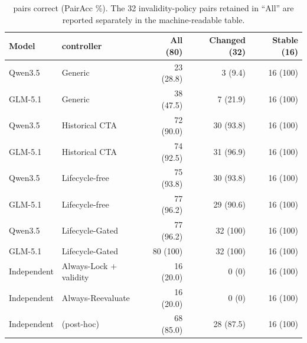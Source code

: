 \documentclass[10pt]{article}
\begin{document}
\begin{table}[h]
\centering
\scriptsize
\setlength{\tabcolsep}{3pt}
\begin{tabular}{llrrr}
\toprule
Model & \PrimaryDiagnostic{} controller & All (80) & Changed (32) & Stable (16) \\
\midrule
Qwen3.5 & Generic & 23 (28.8) & 3 (9.4) & 16 (100) \\
GLM-5.1 & Generic & 38 (47.5) & 7 (21.9) & 16 (100) \\
Qwen3.5 & Historical CTA & 72 (90.0) & 30 (93.8) & 16 (100) \\
GLM-5.1 & Historical CTA & 74 (92.5) & 31 (96.9) & 16 (100) \\
Qwen3.5 & Lifecycle-free & 75 (93.8) & 30 (93.8) & 16 (100) \\
GLM-5.1 & Lifecycle-free & 77 (96.2) & 29 (90.6) & 16 (100) \\
Qwen3.5 & Lifecycle-Gated & 77 (96.2) & 32 (100) & 16 (100) \\
GLM-5.1 & Lifecycle-Gated & 80 (100) & 32 (100) & 16 (100) \\
Independent & Always-Lock + validity & 16 (20.0) & 0 (0) & 16 (100) \\
Independent & Always-Reevaluate & 16 (20.0) & 0 (0) & 16 (100) \\
Independent & \RuleStar{} (post-hoc) & 68 (85.0) & 28 (87.5) & 16 (100) \\
\bottomrule
\end{tabular}
\caption{\PrimaryDiagnostic{} pairs correct (PairAcc \%). The 32 invalidity-policy pairs retained in ``All''
are reported separately in the machine-readable table.}
\end{table}
\end{document}
